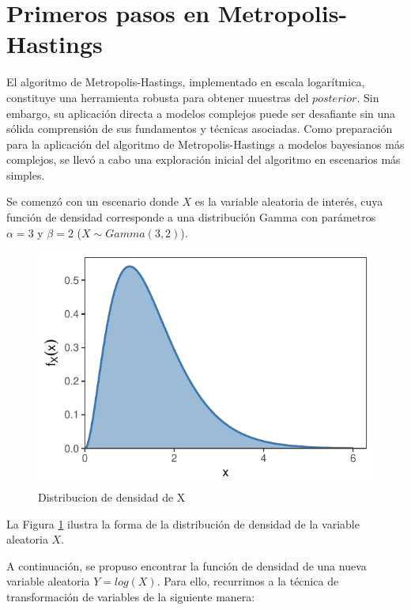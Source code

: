 \documentclass[
]{article}
\begin{document}
\newpage

\section{Primeros pasos en Metropolis-Hastings}\label{Objetivo-1}

El algoritmo de Metropolis-Hastings, implementado en escala logarítmica,
constituye una herramienta robusta para obtener muestras del
\(posterior\). Sin embargo, su aplicación directa a modelos complejos
puede ser desafiante sin una sólida comprensión de sus fundamentos y
técnicas asociadas. Como preparación para la aplicación del algoritmo de
Metropolis-Hastings a modelos bayesianos más complejos, se llevó a cabo
una exploración inicial del algoritmo en escenarios más simples.

Se comenzó con un escenario donde \(X\) es la variable aleatoria
de interés, cuya función de densidad corresponde a una distribución
Gamma con parámetros \(\alpha = 3\) y \(\beta = 2\) (\(X \sim Gamma(3,2)\)).

\begin{figure}

{\centering \includegraphics{TP-2---El-Dibu-de-la-vida_files/figure-latex/f1-1} 

}

\caption{Distribucion de densidad de X}\label{fig:f1}
\end{figure}

La Figura \ref{fig:f1} ilustra la forma de la distribución de densidad
de la variable aleatoria \(X\).

A continuación, se propuso encontrar la función de densidad de una nueva
variable aleatoria \(Y=log(X)\). Para ello, recurrimos a la técnica de
transformación de variables de la siguiente manera:
\end{document}

